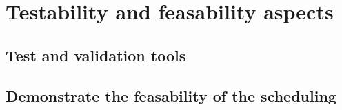 
\chapter{Testability and feasability aspects}
\doMinitoc

\section{Test and validation tools}

\section{Demonstrate the feasability of the scheduling}


